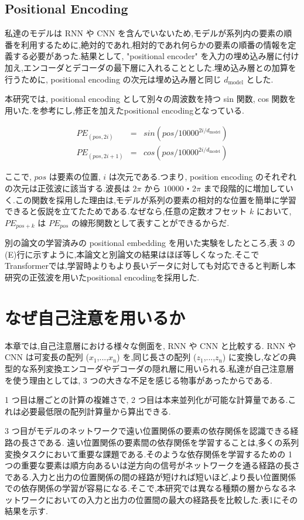 \documentclass{jarticle}     %
\begin{document}
\subsection{Positional Encoding}
私達のモデルは RNN や CNN を含んでいないため,モデルが系列内の要素の順番を利用するために,絶対的であれ,相対的であれ何らかの要素の順番の情報を定義する必要があった.結果として, "positional encoder" を入力の埋め込み層に付け加え,エンコーダとデコーダの最下層に入れることとした.埋め込み層との加算を行うために, positional encoding の次元は埋め込み層と同じ $d_\mathrm{model}$ とした.\par
本研究では, positional encoding として別々の周波数を持つ sin 関数, cos 関数を用いた.\cite{8}を参考にし,修正を加えたpositional encodingとなっている.

\begin{eqnarray*}
  PE_{(pos,2i)} &= &sin(pos/10000^{2i/d_\mathrm{model}}) \\
  PE_{(pos,2i+1)} &= &cos(pos/10000^{2i/d_\mathrm{model}})
\end{eqnarray*}

ここで, $pos$ は要素の位置, $i$ は次元である.つまり, position encoding のそれぞれの次元は正弦波に該当する.波長は $2\pi$ から $10000・2\pi$ まで段階的に増加していく.この関数を採用した理由は,モデルが系列の要素の相対的な位置を簡単に学習できると仮説を立てたためである.なぜなら,任意の定数オフセット $k$ において, $PE_{pos+k}$ は $PE_{pos}$ の線形関数として表すことができるからだ.\par
別の論文の学習済みの positional embedding\cite{8} を用いた実験をしたところ,表 3 の(E)行に示すように,本論文と別論文の結果はほぼ等しくなった.そこでTransformerでは,学習時よりもより長いデータに対しても対応できると判断し本研究の正弦波を用いたpositional encodingを採用した.


\section{なぜ自己注意を用いるか}

本章では,自己注意層における様々な側面を, RNN や CNN と比較する. RNN や CNN は可変長の配列
 ($x_\mathrm{1}$,...,$x_\mathrm{n}$) を,同じ長さの配列 ($z_\mathrm{1}$,...,$z_\mathrm{n}$) に変換し,などの典型的な系列変換エンコーダやデコーダの隠れ層に用いられる.私達が自己注意層を使う理由としては, 3 つの大きな不足を感じる物事があったからである.
\par
1 つ目は層ごとの計算の複雑さで, 2 つ目は本来並列化が可能な計算量である.これは必要最低限の配列計算量から算出できる.
\par
 3 つ目がモデルのネットワークで遠い位置関係の要素の依存関係を認識できる経路の長さである.
遠い位置関係の要素間の依存関係を学習することは,多くの系列変換タスクにおいて重要な課題である.そのような依存関係を学習するための 1 つの重要な要素は順方向あるいは逆方向の信号がネットワークを通る経路の長さである.入力と出力の位置関係の間の経路が短ければ短いほど,より長い位置関係での依存関係の学習が容易になる.\cite{11}そこで,本研究では異なる種類の層からなるネットワークにおいての入力と出力の位置間の最大の経路長を比較した.表1にその結果を示す.
\end{document}
